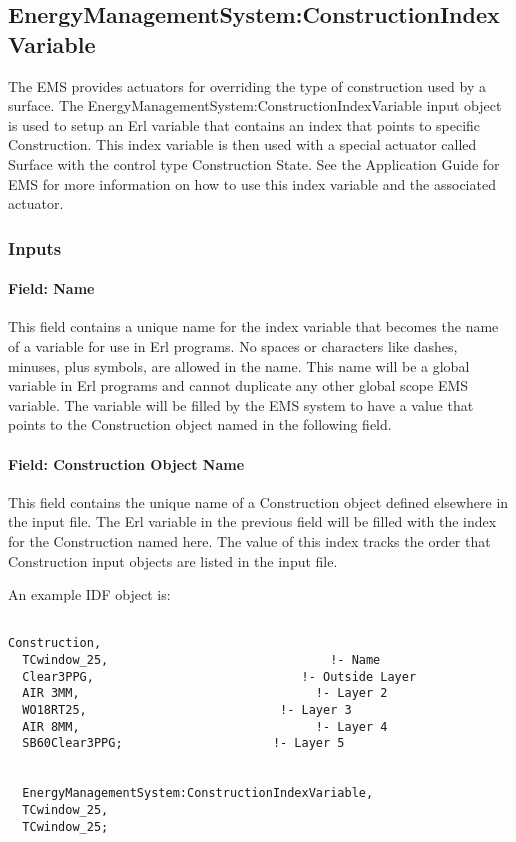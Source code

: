 \subsection{EnergyManagementSystem:ConstructionIndexVariable}\label{energymanagementsystemconstructionindexvariable}

The EMS provides actuators for overriding the type of construction used by a surface. The EnergyManagementSystem:ConstructionIndexVariable input object is used to setup an Erl variable that contains an index that points to specific Construction. This index variable is then used with a special actuator called Surface with the control type Construction State. See the Application Guide for EMS for more information on how to use this index variable and the associated actuator.

\subsubsection{Inputs}\label{inputs-10-004}

\paragraph{Field: Name}\label{field-name-10-004}

This field contains a unique name for the index variable that becomes the name of a variable for use in Erl programs. No spaces or characters like dashes, minuses, plus symbols, are allowed in the name. This name will be a global variable in Erl programs and cannot duplicate any other global scope EMS variable. The variable will be filled by the EMS system to have a value that points to the Construction object named in the following field.

\paragraph{Field: Construction Object Name}\label{field-construction-object-name}

This field contains the unique name of a Construction object defined elsewhere in the input file. The Erl variable in the previous field will be filled with the index for the Construction named here. The value of this index tracks the order that Construction input objects are listed in the input file.

An example IDF object is:

\begin{lstlisting}

Construction,
  TCwindow_25,                               !- Name
  Clear3PPG,                             !- Outside Layer
  AIR 3MM,                                 !- Layer 2
  WO18RT25,                           !- Layer 3
  AIR 8MM,                                 !- Layer 4
  SB60Clear3PPG;                     !- Layer 5


  EnergyManagementSystem:ConstructionIndexVariable,
  TCwindow_25,
  TCwindow_25;
\end{lstlisting}